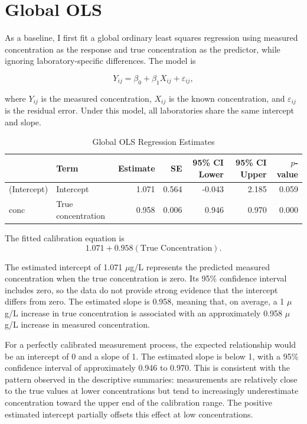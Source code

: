 \documentclass[
]{article}
\begin{document}
\section{Global OLS}\label{global-ols}

As a baseline, I first fit a global ordinary least squares regression
using measured concentration as the response and true concentration as
the predictor, while ignoring laboratory-specific differences. The model
is

\[
Y_{ij} = \beta_0 + \beta_1 X_{ij} + \varepsilon_{ij},
\]

where \(Y_{ij}\) is the measured concentration, \(X_{ij}\) is the known
concentration, and \(\varepsilon_{ij}\) is the residual error. Under
this model, all laboratories share the same intercept and slope.

\begin{table}[!h]
\centering
\caption{\label{tab:OLS}Global OLS Regression Estimates}
\centering
\begin{tabular}[t]{llrrrrr}
\toprule
  & Term & Estimate & SE & 95\% CI Lower & 95\% CI Upper & $p$-value\\
\midrule
(Intercept) & Intercept & 1.071 & 0.564 & -0.043 & 2.185 & 0.059\\
conc & True concentration & 0.958 & 0.006 & 0.946 & 0.970 & 0.000\\
\bottomrule
\end{tabular}
\end{table}

The fitted calibration equation is \[
1.071 + 0.958(\text{True Concentration}).
\]

The estimated intercept of 1.071 \(\mu\)g/L represents the predicted
measured concentration when the true concentration is zero. Its 95\%
confidence interval includes zero, so the data do not provide strong
evidence that the intercept differs from zero. The estimated slope is
0.958, meaning that, on average, a 1 \(\mu\)g/L increase in true
concentration is associated with an approximately 0.958 \(\mu\)g/L
increase in measured concentration.

For a perfectly calibrated measurement process, the expected
relationship would be an intercept of 0 and a slope of 1. The estimated
slope is below 1, with a 95\% confidence interval of approximately 0.946
to 0.970. This is consistent with the pattern observed in the
descriptive summaries: measurements are relatively close to the true
values at lower concentrations but tend to increasingly underestimate
concentration toward the upper end of the calibration range. The
positive estimated intercept partially offsets this effect at low
concentrations.
\end{document}
